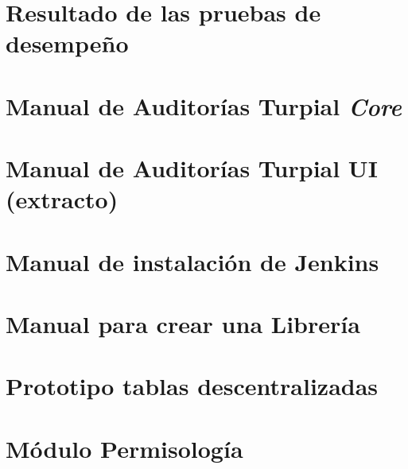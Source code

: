 \documentclass[onehalfspace]{USB}
\begin{document}
\chapter{Resultado de las pruebas de desempeño}


\chapter{Manual de Auditorías Turpial \textit{Core}}


\chapter{Manual de Auditorías Turpial UI (extracto)}


\chapter{Manual de instalación de Jenkins}


\chapter{Manual para crear una Librería}


\chapter{Prototipo tablas descentralizadas}


\chapter{Módulo Permisología}


\end{document}
